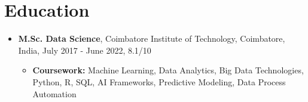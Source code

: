 \documentclass{article}
\begin{document}
    \section{Education}
    \begin{itemize}[noitemsep, topsep=0pt]
        \item \textbf{M.Sc. Data Science}, Coimbatore Institute of Technology, Coimbatore, India, July 2017 - June 2022, 8.1/10
            \begin{itemize}[noitemsep, topsep=0pt]
                \item \textbf{Coursework:} Machine Learning, Data Analytics, Big Data Technologies, Python, R, SQL, AI Frameworks, Predictive Modeling, Data Process Automation
            \end{itemize}
    \end{itemize}
\end{document}
